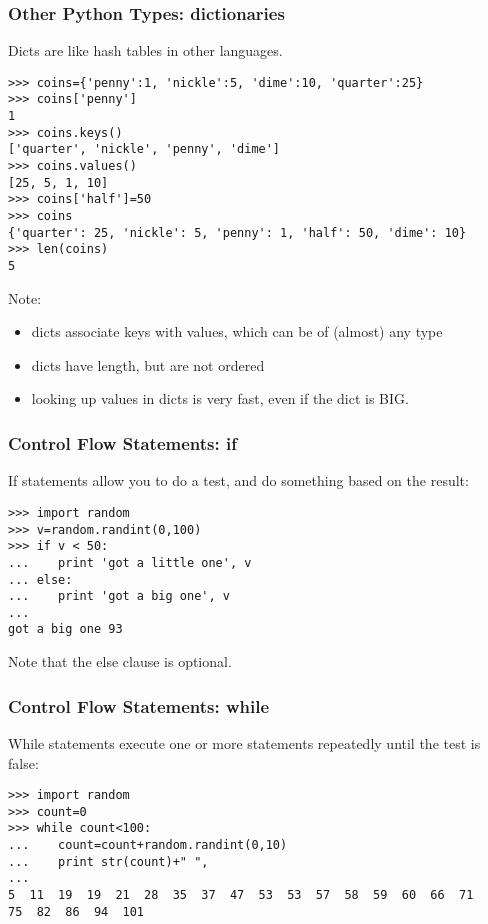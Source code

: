 \documentclass[10pt]{beamer}
\begin{document}
\begin{frame}[fragile]
\frametitle{Other Python Types: dictionaries}

Dicts are like hash tables in other languages.  
\begin{verbatim}
>>> coins={'penny':1, 'nickle':5, 'dime':10, 'quarter':25}
>>> coins['penny']
1
>>> coins.keys()
['quarter', 'nickle', 'penny', 'dime']
>>> coins.values()
[25, 5, 1, 10]
>>> coins['half']=50
>>> coins
{'quarter': 25, 'nickle': 5, 'penny': 1, 'half': 50, 'dime': 10}
>>> len(coins)
5
\end{verbatim}

Note:
\begin{itemize}
\item dicts associate keys with values, which can be of (almost) any type 
\item dicts have length, but are not ordered
\item looking up values in dicts is very fast, even if the dict is BIG.
\end{itemize}

\end{frame}

\begin{frame}[fragile]
\frametitle{Control Flow Statements: if}

If statements allow you to do a test, and do something
based on the result:

\begin{verbatim}
>>> import random
>>> v=random.randint(0,100)
>>> if v < 50:
...    print 'got a little one', v
... else:
...    print 'got a big one', v
... 
got a big one 93
\end{verbatim}

Note that the else clause is optional.

\end{frame}

\begin{frame}[fragile]
\frametitle{Control Flow Statements: while}

While statements execute one or more statements repeatedly until the 
test is false:

\begin{verbatim}
>>> import random
>>> count=0
>>> while count<100:
...    count=count+random.randint(0,10)
...    print str(count)+" ",
... 
5  11  19  19  21  28  35  37  47  53  53  57  58  59  60  66  71  
75  82  86  94  101 
\end{verbatim}

\end{frame}
\end{document}
